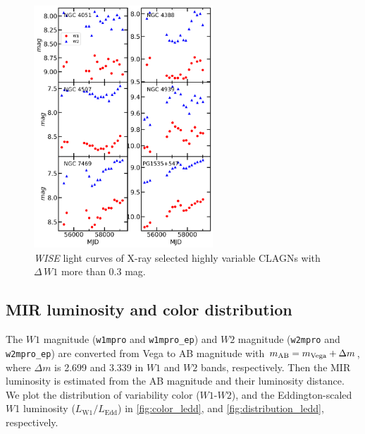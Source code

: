 \documentclass[linenumbers]{aastex631}
\begin{document}
\begin{figure}
\centering
	\includegraphics[width=0.6\textwidth]{pic/wisename_varX.png}
    \caption{{\it WISE} light curves of X-ray selected highly variable CLAGNs with $\Delta\,W1$ more than $0.3$ mag. }
    \label{fig:X-CLAGN-lc}
\end{figure}


\subsection{MIR luminosity and color distribution}
The $W1$ magnitude (\texttt{w1mpro} and \texttt{w1mpro\_ep}) and $W2$ magnitude (\texttt{w2mpro} and \texttt{w2mpro\_ep}) are converted from Vega to AB magnitude with $m_{\rm AB} = m_{\rm Vega} + \Delta m$, where $\Delta m$ is 2.699 and 3.339 in $W1$ and $W2$ bands, respectively. Then the MIR luminosity is estimated from the AB magnitude and their luminosity distance. We plot the distribution of variability color ($W1$-$W2$), and the Eddington-scaled $W$1 luminosity ($L_\mathrm{W1}/L_\mathrm{Edd}$) in \autoref{fig:color_ledd}, and \autoref{fig:distribution_ledd}, respectively.
\end{document}
